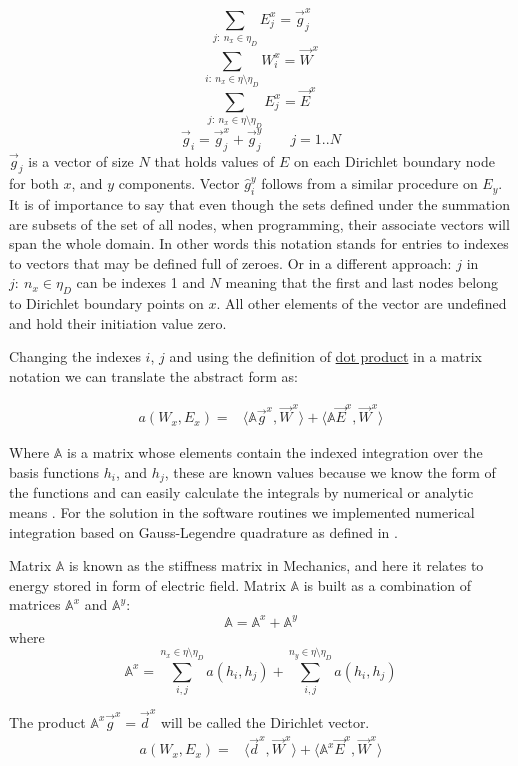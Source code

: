 \[\sum_{j:\ n_x \in \eta_D}E_j^x = \vec{g}_j^x \]
\[\sum_{i:\ n_x \in \eta\setminus\eta_D}W_i^x = \vec{W}^x \]
\[\sum_{j:\ n_x \in \eta\setminus\eta_D}E_j^x = \vec{E}^x \]
\[\vec{g}_i = \vec{g}_j^x+\vec{g}_j^y \qquad j = 1.. N \]
$\vec{g}_j$ is a vector of size $N$ that holds values of $E$ on each Dirichlet boundary node for both $x$, and $y$ components. Vector $\hat{g}_i^y$ follows from a similar procedure on $E_y$. It is of importance to say that even though the sets defined under the summation are subsets of the set of all nodes, when programming, their associate vectors will span the whole domain. In other words this notation stands for entries to indexes to vectors that may be defined full of zeroes. Or in a different approach: $j$ in $j:\ n_x \in \eta_D$ can be indexes 1 and $N$ meaning that the first and last nodes belong to Dirichlet boundary points on $x$. All other elements of the vector are undefined and hold their initiation value zero.


Changing the indexes $i$, $j$ and using the definition of \href{http://en.wikipedia.org/wiki/Dot_product}{dot product} in a matrix notation we can translate the abstract form as:

\begin{align*}
a\left(W_x,E_x\right)=&\langle \mathbb{A}\vec{g}^x,\vec{W}^x\rangle
+\langle\mathbb{A}\vec{E}^x,\vec{W}^x\rangle  
\end{align*}

Where $\mathbb{A}$ is a matrix whose elements contain the indexed integration over the basis functions $h_i$, and $h_j$, these are known values because we know the form of the functions and can easily calculate the integrals by numerical or analytic means . For the solution in the software routines we implemented numerical integration based on Gauss-Legendre quadrature as defined in \cite{Bathe1996}. 

Matrix $\mathbb{A}$ is known as the stiffness matrix in Mechanics, and here it relates to energy stored in form of electric field. Matrix $\mathbb{A}$ is built as a combination of matrices $\mathbb{A}^x$ and $\mathbb{A}^y$:
\[\mathbb{A} = \mathbb{A}^x+\mathbb{A}^y\]
where
\[\mathbb{A}^x = \sum_{i,j}^{n_x \in \eta\setminus\eta_D} a(h_i,h_j)+\sum_{i,j}^{n_y \in \eta\setminus\eta_D} a(h_i,h_j)\]

The product $\mathbb{A}^x\vec{g}^x = \vec{d}^x$ will be called the Dirichlet vector.
\begin{align}
a\left(W_x,E_x\right)=&\langle \vec{d}^x,\vec{W}^x\rangle
+\langle\mathbb{A}^x\vec{E}^x,\vec{W}^x\rangle \label{eq:potential_discrete} 
\end{align}

